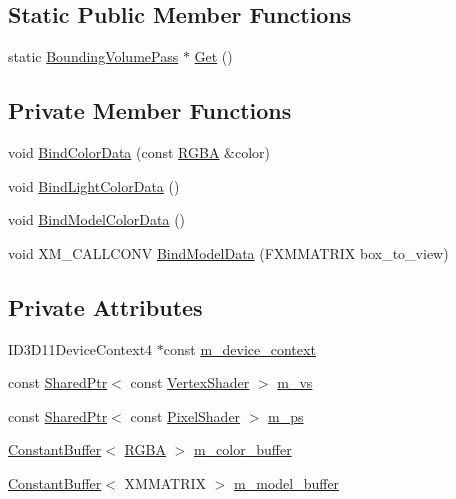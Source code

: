 \subsection*{Static Public Member Functions}
\begin{DoxyCompactItemize}
\item 
static \hyperlink{classmage_1_1_bounding_volume_pass}{Bounding\+Volume\+Pass} $\ast$ \hyperlink{classmage_1_1_bounding_volume_pass_a254c44c1c9f18967c9d6cdb6e53d3bcd}{Get} ()
\end{DoxyCompactItemize}
\subsection*{Private Member Functions}
\begin{DoxyCompactItemize}
\item 
void \hyperlink{classmage_1_1_bounding_volume_pass_a29a98f857f8ae45a0230b96f78f2dcb9}{Bind\+Color\+Data} (const \hyperlink{structmage_1_1_r_g_b_a}{R\+G\+BA} \&color)
\item 
void \hyperlink{classmage_1_1_bounding_volume_pass_a9dcca637d98ea8335777094d3d994f5c}{Bind\+Light\+Color\+Data} ()
\item 
void \hyperlink{classmage_1_1_bounding_volume_pass_af4591758a8dfa7cd19a0f87a0273e470}{Bind\+Model\+Color\+Data} ()
\item 
void X\+M\+\_\+\+C\+A\+L\+L\+C\+O\+NV \hyperlink{classmage_1_1_bounding_volume_pass_ae84dd1e056235a5fdbc7c496b6b99d1d}{Bind\+Model\+Data} (F\+X\+M\+M\+A\+T\+R\+IX box\+\_\+to\+\_\+view)
\end{DoxyCompactItemize}
\subsection*{Private Attributes}
\begin{DoxyCompactItemize}
\item 
I\+D3\+D11\+Device\+Context4 $\ast$const \hyperlink{classmage_1_1_bounding_volume_pass_a4ee95284ca70becba75d4be1a19268d7}{m\+\_\+device\+\_\+context}
\item 
const \hyperlink{namespacemage_a1e01ae66713838a7a67d30e44c67703e}{Shared\+Ptr}$<$ const \hyperlink{classmage_1_1_vertex_shader}{Vertex\+Shader} $>$ \hyperlink{classmage_1_1_bounding_volume_pass_aa10e1d4cc354b9b0d41789f453ea9cde}{m\+\_\+vs}
\item 
const \hyperlink{namespacemage_a1e01ae66713838a7a67d30e44c67703e}{Shared\+Ptr}$<$ const \hyperlink{namespacemage_a27ecaf266420ee7a494d64edc0757129}{Pixel\+Shader} $>$ \hyperlink{classmage_1_1_bounding_volume_pass_a30c85c0e4766e4e330d906af2ecc7463}{m\+\_\+ps}
\item 
\hyperlink{classmage_1_1_constant_buffer}{Constant\+Buffer}$<$ \hyperlink{structmage_1_1_r_g_b_a}{R\+G\+BA} $>$ \hyperlink{classmage_1_1_bounding_volume_pass_aeb60ac6a87ba6fdd6a87fb750e2f3d10}{m\+\_\+color\+\_\+buffer}
\item 
\hyperlink{classmage_1_1_constant_buffer}{Constant\+Buffer}$<$ X\+M\+M\+A\+T\+R\+IX $>$ \hyperlink{classmage_1_1_bounding_volume_pass_a07df0f32726f390dd0f060bc6d61b40e}{m\+\_\+model\+\_\+buffer}
\end{DoxyCompactItemize}


